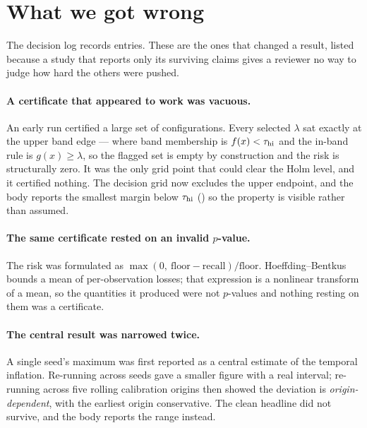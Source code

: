 \section{What we got wrong}

The decision log records \ClaimDecisionEntries{} entries. These are the ones that changed a result, listed
because a study that reports only its surviving claims gives a reviewer no way to judge how
hard the others were pushed.

\paragraph{A certificate that appeared to work was vacuous.} An early run certified a large
set of configurations. Every selected $\lambda$ sat exactly at the upper band edge --- where
band membership is $f(x) < \tau_{\mathrm{hi}}$ and the in-band rule is $g(x) \ge \lambda$, so the flagged
set is empty by construction and the risk is structurally zero. It was the only grid point
that could clear the Holm level, and it certified nothing. The decision grid now excludes the
upper endpoint, and the body reports the smallest margin below $\tau_{\mathrm{hi}}$ (\ClaimCertificateMargin)
so the property is visible rather than assumed.

\paragraph{The same certificate rested on an invalid $p$-value.} The risk was formulated as
$\max(0,\ \text{floor} - \text{recall})/\text{floor}$. Hoeffding--Bentkus bounds a mean of
per-observation losses; that expression is a nonlinear transform of a mean, so the quantities
it produced were not $p$-values and nothing resting on them was a certificate.

\paragraph{The central result was narrowed twice.} A single seed's maximum was first reported
as a central estimate of the temporal inflation. Re-running across seeds
gave a smaller figure with a real interval; re-running across five rolling calibration origins
then showed the deviation is \emph{origin-dependent}, with the earliest origin conservative.
The clean headline did not survive, and the body reports the range instead.

